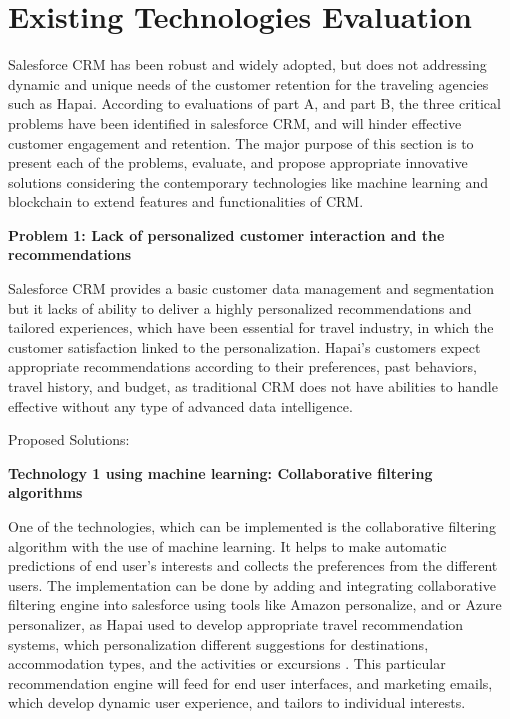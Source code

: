 \documentclass{article}
\begin{document}
\section{Existing Technologies Evaluation}

Salesforce CRM has been robust and widely adopted, but does not addressing dynamic and unique needs of the customer retention for the traveling agencies such as Hapai. According to evaluations of part A, and part B, the three critical problems have been identified in salesforce CRM, and will hinder effective customer engagement and retention. The major purpose of this section is to present each of the problems, evaluate, and propose appropriate innovative solutions considering the contemporary technologies like machine learning and blockchain to extend features and functionalities of CRM. 

\textbf{Problem 1: Lack of personalized customer interaction and the recommendations}

Salesforce CRM provides a basic customer data management and segmentation but it lacks of ability to deliver a highly personalized recommendations and tailored experiences, which have been essential for travel industry, in which the customer satisfaction linked to the personalization. Hapai’s customers expect appropriate recommendations \cite{lambillotte_enhancing_2022} according to their preferences, past behaviors, travel history, and budget, as traditional CRM does not have abilities to handle effective without any type of advanced data intelligence. 

Proposed Solutions:

\textbf{Technology 1 using machine learning: Collaborative filtering algorithms}

One of the technologies, which can be implemented is the collaborative filtering algorithm with the use of machine learning. It helps to make automatic predictions of end user’s interests and collects the preferences from the different users. The implementation can be done by adding and integrating collaborative filtering engine into salesforce using tools like Amazon personalize, and or Azure personalizer, as Hapai used to develop appropriate travel recommendation systems, which personalization different suggestions for destinations, accommodation types, and the activities or excursions \cite{song_research_2020}. This particular recommendation engine will feed for end user interfaces, and marketing emails, which develop dynamic user experience, and tailors to individual interests. 
\end{document}

